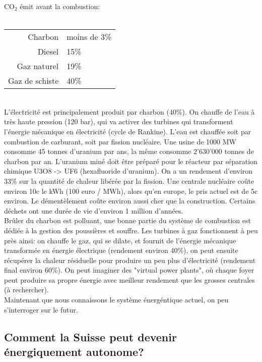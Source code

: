 \documentclass{Article}
\begin{document}
 CO$_2$ émit avant la combustion: \\ \\
\begin{tabular}{ r | l }
	Charbon & moins de 3\% \\
	Diesel  & 15\% \\
	Gaz naturel & 19\% \\
	Gaz de schiste & 40\% \\
\end{tabular} \\

L'électricité est principalement produit par charbon (40\%). On chauffe de l'eau à très haute pression (120 bar), qui va activer des turbines qui transforment l'énergie mécanique en électricité (cycle de Rankine). L'eau est chauffée soit par combustion de carburant, soit par fission nucléaire. Une usine de 1000 MW consomme 45 tonnes d'uranium par ans, la même consomme 2'630'000 tonnes de charbon par an. L'uranium miné doit être préparé pour le réacteur par séparation chimique U3O8 -> UF6 (hexafluoride d'uranium).  On a un rendement d'environ 33\% sur la quantité de chaleur libérée par la fission. Une centrale nucléaire coûte environ 10c le kWh (100 euro / MWh), alors qu'en europe, le pris actuel est de 5c environ. Le démentèlement coûte environ aussi cher que la construction. Certains déchets ont une durée de vie d'environ 1 million d'années. \\

 Brûler du charbon est polluant, une bonne partie du système de combustion est dédiée à la gestion des poussières et souffre. Les turbines à gaz fonctionnent à peu près ainsi: on chauffe le gaz, qui se dilate, et fournit de l'énergie mécanique transformée en énergie électrique (rendement environ 40\%), on peut ensuite récupérer la chaleur résiduelle pour produire un peu plus d'électricité (rendement final environ 60\%). On peut imaginer des "virtual power plants", où chaque foyer peut produire sa propre énergie avec meilleur rendement que les grosses centrales (à rechercher). \\

Maintenant que nous connaissons le système énergéntique actuel, on peu s'interroger sur le futur.

\subsection{Comment la Suisse peut devenir énergiquement autonome?}
\end{document}
